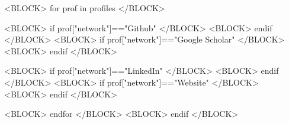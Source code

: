 <BLOCK> for prof in profiles </BLOCK>

  <BLOCK> if prof["network"]=="Github" </BLOCK>
  <BLOCK> endif </BLOCK>
  <BLOCK> if prof["network"]=="Google Scholar" </BLOCK>
  <BLOCK> endif </BLOCK>

  <BLOCK> if prof["network"]=="LinkedIn" </BLOCK>
  <BLOCK> endif </BLOCK>
    <BLOCK> if prof["network"]=="Website" </BLOCK>
  <BLOCK> endif </BLOCK>


<BLOCK> endfor </BLOCK>
<BLOCK> endif </BLOCK>


%
%
%
%









